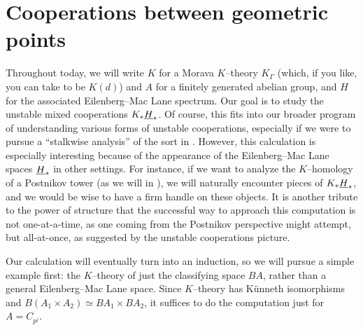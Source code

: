 \section{Cooperations between geometric points}


Throughout today, we will write $K$ for a Morava $K$--theory $K_\Gamma$ (which, if you like, you can take to be $K(d)$) and $A$ for a finitely generated abelian group, and $H$ for the associated Eilenberg--Mac Lane spectrum.  Our goal is to study the unstable mixed cooperations $K_* \underline{\smash{H}}_{*}$.  Of course, this fits into our broader program of understanding various forms of unstable cooperations, especially if we were to pursue a ``stalkwise analysis'' of the sort in .  However, this calculation is especially interesting because of the appearance of the Eilenberg--Mac Lane spaces $\underline{\smash{H}}_{*}$ in other settings.  For instance, if we want to analyze the $K$--homology of a Postnikov tower (as we will in ), we will naturally encounter pieces of $K_* \underline{\smash{H}}_{*}$, and we would be wise to have a firm handle on these objects.  It is another tribute to the power of structure that the successful way to approach this computation is not one-at-a-time, as one coming from the Postnikov perspective might attempt, but all-at-once, as suggested by the unstable cooperations picture.

Our calculation will eventually turn into an induction, so we will pursue a simple example first: the $K$--theory of just the classifying space $BA$, rather than a general Eilenberg--Mac Lane space.  Since $K$--theory has K\"unneth isomorphisms and $B(A_1 \times A_2) \simeq BA_1 \times BA_2$, it suffices to do the computation just for $A = C_{p^j}$.

